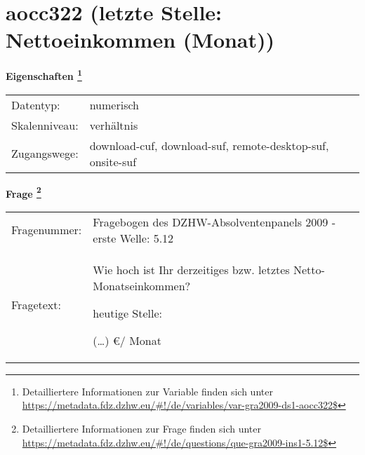 
    \setcounter{footnote}{0}

    \vspace*{-1.8cm}
	\section{aocc322 (letzte Stelle: Nettoeinkommen (Monat))}
	\label{section:aocc322}



    \vspace*{0.5cm}
    \noindent\textbf{Eigenschaften
	\footnote{Detailliertere Informationen zur Variable finden sich unter
		\url{https://metadata.fdz.dzhw.eu/\#!/de/variables/var-gra2009-ds1-aocc322$}}}\\
	\begin{tabularx}{\hsize}{@{}lX}
	Datentyp: & numerisch \\
	Skalenniveau: & verhältnis \\
	Zugangswege: &
	  download-cuf, 
	  download-suf, 
	  remote-desktop-suf, 
	  onsite-suf
 \\
    \end{tabularx}



				\vspace*{0.5cm}
                \noindent\textbf{Frage
	                \footnote{Detailliertere Informationen zur Frage finden sich unter
		              \url{https://metadata.fdz.dzhw.eu/\#!/de/questions/que-gra2009-ins1-5.12$}}}\\
				\begin{tabularx}{\hsize}{@{}lX}
					Fragenummer: &
					  Fragebogen des DZHW-Absolventenpanels 2009 - erste Welle:
					  5.12
 \\
					Fragetext: & Wie hoch ist Ihr derzeitiges bzw. letztes Netto- Monatseinkommen?\par  heutige Stelle:\par  (…) €/ Monat \\
				\end{tabularx}





